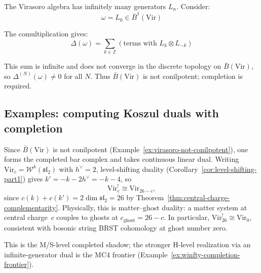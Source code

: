 \begin{example}
\label{ex:virasoro-not-conilpotent}
The Virasoro algebra has infinitely many generators $L_n$. Consider:
\begin{equation}
\omega = L_0 \in \bar{B}^1(\text{Vir})
\end{equation}

The comultiplication gives:
\begin{equation}
\Delta(\omega) = \sum_{k \in \mathbb{Z}} (\text{terms with } L_k \otimes L_{-k})
\end{equation}

This sum is infinite and does not converge in the discrete topology on $\bar{B}(\text{Vir})$, so $\Delta^{(N)}(\omega) \neq 0$ for all $N$.
Thus $\bar{B}(\text{Vir})$ is not conilpotent; completion is required.
\end{example}

\subsection{Examples: computing Koszul duals with completion}
\label{sec:koszul-duals-completion-examples}

\begin{example}
\label{ex:virasoro-koszul-dual}

Since $\bar{B}(\mathrm{Vir})$ is not conilpotent
(Example~\ref{ex:virasoro-not-conilpotent}), one forms the
completed bar complex and takes continuous linear dual.
Writing $\mathrm{Vir}_c = \mathcal{W}^k(\mathfrak{sl}_2)$
with $h^\vee = 2$, level-shifting duality
(Corollary~\ref{cor:level-shifting-part1}) gives
$k' = -k - 2h^\vee = -k-4$, so
\begin{equation}
\mathrm{Vir}_c^! \cong \mathrm{Vir}_{26-c},
\end{equation}
since $c(k) + c(k') = 2\dim\mathfrak{sl}_2 = 26$ by Theorem~\ref{thm:central-charge-complementarity}.  Physically, this is matter--ghost duality: a matter system at central charge~$c$ couples to ghosts at $c_{\mathrm{ghost}} = 26 - c$.  In particular, $\mathrm{Vir}_{26}^! \cong \mathrm{Vir}_0$, consistent with bosonic string BRST cohomology at ghost number zero.

This is the M/S-level completed shadow; the stronger H-level realization via an infinite-generator dual is the MC4 frontier (Example~\ref{ex:winfty-completion-frontier}).
\end{example}

